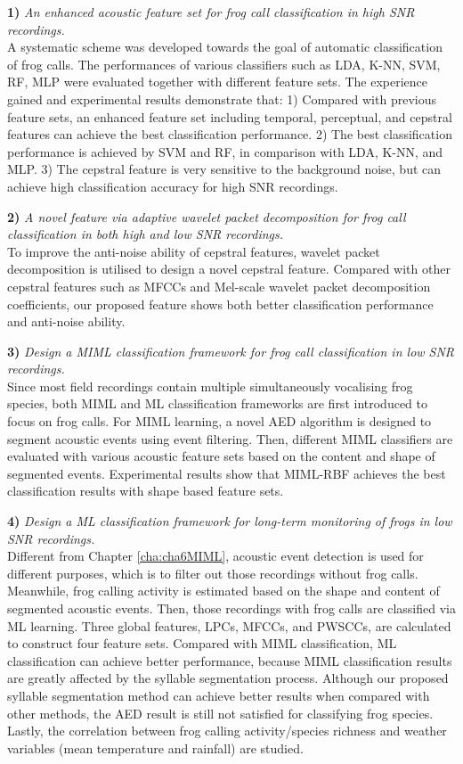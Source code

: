 \textbf{1)} \textit{An enhanced acoustic feature set for frog call classification in high SNR recordings.} 
\\
A systematic scheme was developed towards the goal of automatic classification of frog calls. The performances of various classifiers such as LDA, K-NN, SVM, RF, MLP were evaluated together with different feature sets. The experience gained and experimental results demonstrate that: 1) Compared with previous feature sets, an enhanced feature set including temporal, perceptual, and cepstral features can achieve the best classification performance. 2) The best classification performance is achieved by SVM and RF, in comparison with LDA, K-NN, and MLP. 3) The cepstral feature is very sensitive to the background noise, but can achieve high classification accuracy for high SNR recordings. 

\textbf{2)} \textit{A novel feature via adaptive wavelet packet decomposition for frog call classification in both high and low SNR recordings.}
\\
To improve the anti-noise ability of cepstral features, wavelet packet decomposition is utilised to design a novel cepstral feature. Compared with other cepstral features such as MFCCs and Mel-scale wavelet packet decomposition coefficients, our proposed feature shows both better classification performance and anti-noise ability. 



\textbf{3)}  \textit{Design a MIML classification framework for frog call classification in low SNR recordings.} 
\\
Since most field recordings contain multiple simultaneously vocalising frog species, both MIML and ML classification frameworks are first introduced to focus on frog calls. For MIML learning, a novel AED algorithm is designed to segment acoustic events using event filtering. Then, different MIML classifiers are evaluated with various acoustic feature sets based on the content and shape of segmented events. Experimental results show that MIML-RBF achieves the best classification results with shape based feature sets. 


\textbf{4)}  \textit{Design a ML classification framework for long-term monitoring of frogs in low SNR recordings.} 
\\
Different from Chapter \ref{cha:cha6MIML}, acoustic event detection is used for different purposes, which is to filter out those recordings without frog calls. Meanwhile, frog calling activity is estimated based on the shape and content of segmented acoustic events. Then, those recordings with frog calls are classified via ML learning. Three global features, LPCs, MFCCs, and PWSCCs, are calculated to construct four feature sets. Compared with MIML classification, ML classification can achieve better performance, because MIML classification results are greatly affected by the syllable segmentation process. Although our proposed syllable segmentation method can achieve better results when compared with 
other methods, the AED result is still not satisfied for classifying frog species. Lastly, the correlation between frog calling activity/species richness and weather variables (mean temperature and rainfall) are studied.

